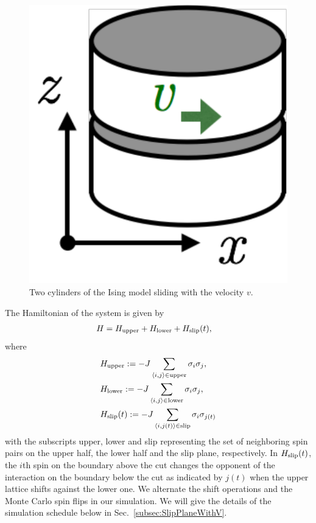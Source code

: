 \begin{figure}[htbp]
	\centering
	\includegraphics[width=0.25\linewidth]{CutIsing.pdf}
	\caption{Two cylinders of the Ising model sliding with the velocity $v$.}
	\label{fig:CutIsing}
\end{figure}
The Hamiltonian of the system is given by
\begin{align}
&H=H_{\rm upper} + H_{\rm lower} + H_{\rm slip}(t),
\end{align}
where
\begin{align}
&H_{\rm upper}:=-J\sum_{\langle i,j\rangle\in\mathrm{upper}}\sigma_{i}\sigma_{j}\label{ham:upper}, \\
&H_{\rm lower}:=-J\sum_{\langle i,j\rangle\in\mathrm{lower}}\sigma_{i}\sigma_{j}\label{ham:lower}, \\
&H_{\rm slip}(t):=-J\sum_{\langle i,j(t)\rangle\in\mathrm{slip}}\sigma_{i}\sigma_{j(t)}\label{ham:slip}
\end{align}
with the subscripts upper, lower and slip representing the set of neighboring spin pairs on the upper half, the lower half and the slip plane, respectively. In $H_{\rm slip}(t)$, the $i$th spin on the boundary above the cut changes the opponent of the interaction on the boundary below the cut as indicated by $j(t)$ when the upper lattice shifts against the lower one. We alternate the shift operations and the Monte Carlo spin flips in our simulation. We will give the details of the simulation schedule below in Sec.~\ref{subsec:SlipPlaneWithV}.

